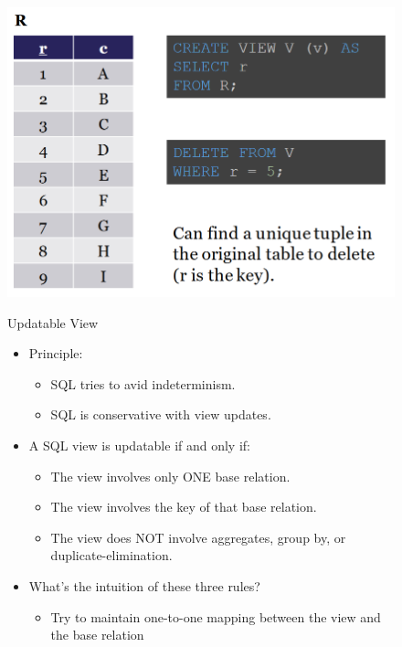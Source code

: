 \begin{figure}[H]
\centering
\includegraphics[width=.5\textwidth]{images/updatable_view.PNG}
\label{updatable_view}
\caption{Updatable View}
\end{figure}
\begin{figure}[H]
\begin{minipage}{.5\textwidth}
\begin{itemize}
\item Principle:
\begin{itemize}
\item SQL tries to avid indeterminism.
\item SQL is conservative with view updates.
\end{itemize}
\item A SQL view is updatable if and only if:
\begin{itemize}
\item The view involves only ONE base relation.
\item The view involves the key of that base relation.
\item The view does NOT involve aggregates, group by, or duplicate-elimination.
\end{itemize}
\item What's the intuition of these three rules?
\begin{itemize}
\item Try to maintain one-to-one mapping between the view and the base relation
\end{itemize}
\end{itemize}
\end{minipage}
\begin{minipage}{.5\textwidth}
\centering

\end{minipage}
\end{figure}
